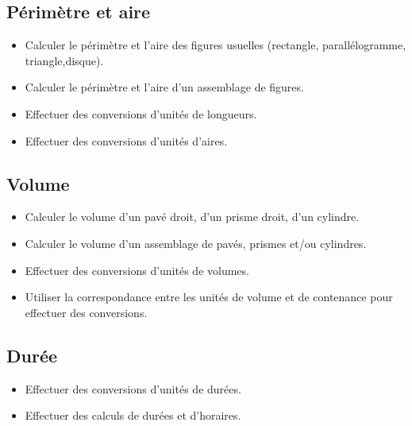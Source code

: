 \documentclass[a4paper,12pt,fleqn]{article}	
\begin{document}
\renewcommand{\labelitemi}{}

\subsection*{Périmètre et aire}

\begin{itemize}
	\item {}Calculer le périmètre et l’aire des figures usuelles (rectangle, parallélogramme, triangle,disque). %
	\item {}Calculer le périmètre et l’aire d’un assemblage de figures.%
	\item {}Effectuer des conversions d’unités de longueurs.
	\item {}Effectuer des conversions d’unités d’aires.
\end{itemize}

\subsection*{Volume}

\begin{itemize}
	\item {}Calculer le volume d’un pavé droit, d’un prisme droit, d’un cylindre.%
	\item {}Calculer le volume d’un assemblage de pavés, prismes et/ou cylindres.%
	\item {}Effectuer des conversions d’unités de volumes.
	\item {}Utiliser la correspondance entre les unités de volume et de contenance pour effectuer des conversions. %
\end{itemize}

\subsection*{Durée}

\begin{itemize}
	\item {}Effectuer des conversions d’unités de durées.
	\item {}Effectuer des calculs de durées et d’horaires. %
\end{itemize}

	
\end{document}

